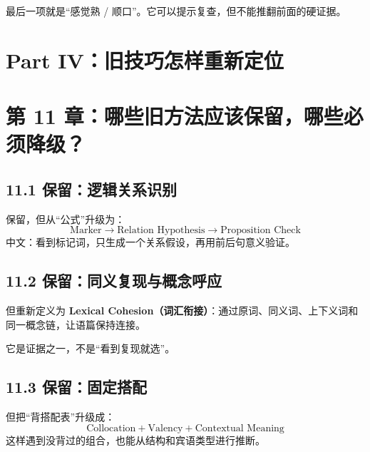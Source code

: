 \documentclass[11pt,a4paper]{ctexart}
\newcommand{\term}[2]{\textbf{#1（#2）}}
\begin{document}
\begin{center}
\end{center}
最后一项就是“感觉熟 / 顺口”。它可以提示复查，但不能推翻前面的硬证据。

\newpage
\section{Part IV：旧技巧怎样重新定位}

\section{第 11 章：哪些旧方法应该保留，哪些必须降级？}

\subsection{11.1 保留：逻辑关系识别}
保留，但从“公式”升级为：
\[
\boxed{
\text{Marker}
\rightarrow
\text{Relation Hypothesis}
\rightarrow
\text{Proposition Check}
}
\]
中文：看到标记词，只生成一个关系假设，再用前后句意义验证。

\subsection{11.2 保留：同义复现与概念呼应}
但重新定义为 \term{Lexical Cohesion}{词汇衔接}：通过原词、同义词、上下义词和同一概念链，让语篇保持连接。

它是证据之一，不是“看到复现就选”。

\subsection{11.3 保留：固定搭配}
但把“背搭配表”升级成：
\[
\boxed{
\text{Collocation}
+
\text{Valency}
+
\text{Contextual Meaning}
}
\]
这样遇到没背过的组合，也能从结构和宾语类型进行推断。
\end{document}
